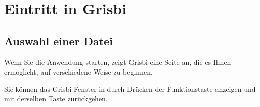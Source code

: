 
\chapter{Eintritt in Grisbi\label{entrance}} %

\section{Auswahl einer Datei\label{select-file}} %


Wenn Sie die Anwendung starten, zeigt Grisbi eine Seite an, die es Ihnen ermöglicht, auf verschiedene Weise zu beginnen.%


Sie können das Grisbi-Fenster in  durch Drücken der Funktionstaste  anzeigen und mit derselben Taste zurückgehen.


